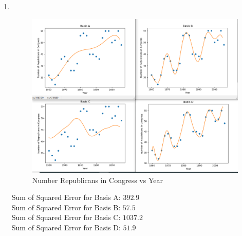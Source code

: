 \documentclass[submit]{harvardml}
\begin{document}
\begin{enumerate}
    \item 
    \\
    \begin{figure} [h!]
        \centering
        \includegraphics[width=\textwidth]{HW1/ps1-p4-repub-years - Copy.png}
        \caption{Number Republicans in Congress vs Year}
    \end{figure}
    Sum of Squared Error for Basis A:  $392.9$ \\
    Sum of Squared Error for Basis B:  $57.5$ \\
    Sum of Squared Error for Basis C:  $1037.2$ \\
    Sum of Squared Error for Basis D:  $51.9$ \\
    

\end{enumerate}
\end{document}
